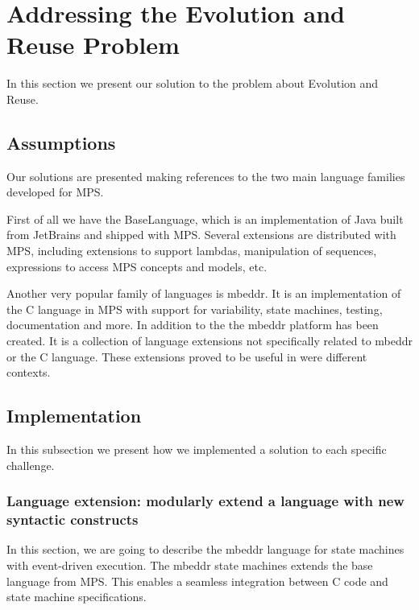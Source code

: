\documentclass[preprint,numbers,10pt]{sigplanconf}
\begin{document}
%
%

\section{Addressing the Evolution and Reuse Problem}

In this section we present our solution to the problem about Evolution and Reuse.

\subsection{Assumptions}

Our solutions are presented making references to the two main language families developed for MPS.

First of all we have the BaseLanguage, which is an implementation of Java built from JetBrains and shipped with MPS. Several extensions are distributed with MPS, including extensions to support lambdas, manipulation of sequences, expressions to access MPS concepts and models, etc.

Another very popular family of languages is mbeddr. It is an implementation of the C language in MPS with support for variability, state machines, testing, documentation and more. In addition to the the mbeddr platform has been created. It is a collection of language extensions not specifically related to mbeddr or the C language. These extensions proved to be useful in were different contexts.

\subsection{Implementation}

In this subsection we present how we implemented a solution to each specific challenge.

\subsubsection{Language extension: modularly extend a language with new syntactic constructs}
\label{evr:langext}

In this section, we are going to describe the mbeddr language for state
machines with event-driven execution. The mbeddr state machines extends
the base language from MPS. This enables a seamless integration between
C code and state machine specifications.
\end{document}
